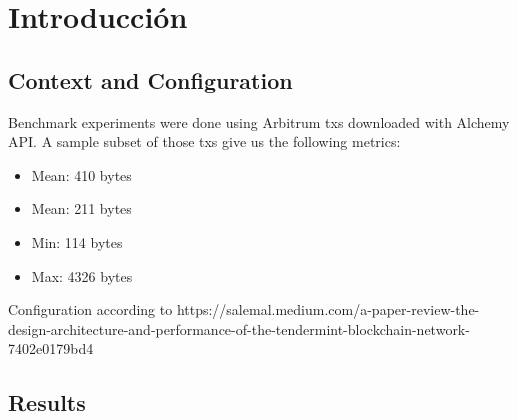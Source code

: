\section{Introducción}\label{sec:benchmark}



\subsection{Context and Configuration}
%
Benchmark experiments were done using Arbitrum txs downloaded with Alchemy API.
%
A sample subset of those txs give us the following metrics:
\begin{itemize}
	\item Mean: 410 bytes
	\item Mean: 211 bytes
	\item Min: 114 bytes
	\item Max: 4326 bytes
\end{itemize}
%

Configuration according to 
https://salemal.medium.com/a-paper-review-the-design-architecture-and-performance-of-the-tendermint-blockchain-network-7402e0179bd4


\subsection{Results}




